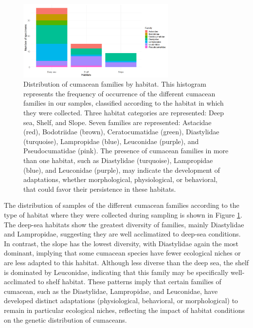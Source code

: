 \begin{figure}[]
    \centering
    \includegraphics[width=0.7\textwidth]{figure4.png}
    \caption{Distribution of cumacean families by habitat. This histogram represents the frequency of occurrence of the different cumacean families in our samples, classified according to the habitat in which they were collected. Three habitat categories are represented: Deep sea, Shelf, and Slope. Seven families are represented: Astacidae (red), Bodotriidae (brown), Ceratocumatidae (green), Diastylidae (turquoise), Lampropidae (blue), Leuconidae (purple), and Pseudocumatidae (pink). The presence of cumacean families in more than one habitat, such as Diastylidae (turquoise), Lampropidae (blue), and Leuconidae (purple), may indicate the development of adaptations, whether morphological, physiological, or behavioral, that could favor their persistence in these habitats. \label{fig:fig5}}
\end{figure}

The distribution of samples of the different cumacean families according to the type of habitat where they were collected during sampling is shown in Figure \ref{fig:fig5}. The deep-sea habitats show the greatest diversity of families, mainly Diastylidae and Lampropidae, suggesting they are well acclimatized to deep-sea conditions. In contrast, the slope has the lowest diversity, with Diastylidae again the most dominant, implying that some cumacean species have fewer ecological niches or are less adapted to this habitat. Although less diverse than the deep sea, the shelf is dominated by Leuconidae, indicating that this family may be specifically well-acclimated to shelf habitat. These patterns imply that certain families of cumacean, such as the Diastylidae, Lampropidae, and Leuconidae, have developed distinct adaptations (physiological, behavioral, or morphological) to remain in particular ecological niches, reflecting the impact of habitat conditions on the genetic distribution of cumaceans.

